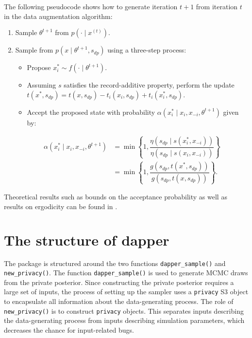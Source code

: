 The following pseudocode shows how to generate iteration \(t+1\) from iteration \(t\)
in the data augmentation algorithm:

\begin{enumerate}
\def\labelenumi{\arabic{enumi}.}
\tightlist
\item
  Sample \(\theta^{t+1}\) from \(p(\cdot \mid x^{(t)})\).
\item
  Sample from \(p(x \mid \theta^{t+1}, s_{dp})\) using a three-step process:

  \begin{itemize}
  \tightlist
  \item
    Propose \(x_{i}^{*} \sim f(\cdot \mid \theta^{t+1})\).
  \item
    Assuming \(s\) satisfies the record-additive property, perform the
    update \(t(x^*, s_{dp}) = t(x,s_{dp}) - t_i(x_i,s_{dp}) + t_{i}(x_i^*, s_{dp})\).
  \item
    Accept the proposed state with probability \(\alpha(x_i^* \mid x_i, x_{-i}, \theta^{t+1})\)
    given by:
  \end{itemize}

  \begin{equation*}
   \begin{aligned}
   \alpha(x_i^* \mid x_i, x_{-i}, \theta^{t+1}) &= \min \left\{ 1, \dfrac{\eta(s_{dp} \mid s(x_i^*, x_{-i}))}{\eta(s_{dp} \mid s(x_i, x_{-i}))} \right\}\\
   &= \min \left\{ 1, \dfrac{g(s_{dp}, t(x^*, s_{dp}))}{g(s_{dp}, t(x,s_{dp}))} \right\}.
   \end{aligned}
   \end{equation*}
\end{enumerate}

Theoretical results such as bounds on the acceptance probability as well as
results on ergodicity can be found in \citet{Ju2022}.

\section{The structure of dapper}\label{sec:structure}

The  package is structured around the two functions \texttt{dapper\_sample()} and
\texttt{new\_privacy()}. The function \texttt{dapper\_sample()} is used to generate MCMC draws from
the private posterior. Since constructing the private posterior requires
a large set of inputs, the process of setting up the
sampler uses a \texttt{privacy} S3 object to encapsulate
all information about the data-generating process. The role of \texttt{new\_privacy()} is to
construct \texttt{privacy} objects. This separates inputs describing the data-generating
process from inputs describing simulation parameters, which decreases
the chance for input-related bugs.

